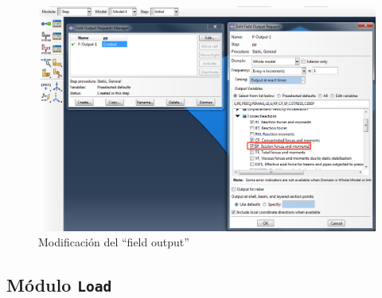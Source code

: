 \documentclass[spanish,a4paper,12pt]{article}
\begin{document}
\begin{figure}[h!tp]
\centering
\includegraphics[scale=0.4]{capturas/16a-step-x.png}
\caption{Modificación del ``field output''}
\label{fig:field-output}
\end{figure}
\clearpage

\subsection{Módulo \texttt{Load}}
\end{document}
